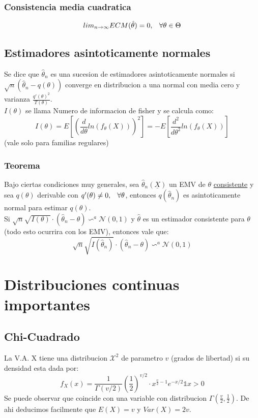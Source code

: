\documentclass[titlepage,a4paper]{article}
\begin{document}
\subsubsection{Consistencia media cuadratica}
\begin{equation*}
    lim_{n \rightarrow \infty}ECM(\hat{\theta}) = 0, \hspace{8px} \forall \theta \in \Theta
\end{equation*}
\subsection{Estimadores asintoticamente normales}
Se dice que $\hat{\theta}_{n}$ es una sucesion de estimadores asintoticamente normales si $\sqrt{n}(\hat{\theta}_{n} - q(\theta))$
converge en distribucion a una normal con media cero y varianza $\frac{q'(\theta)^{2}}{T(\theta)}$.\\
$I(\theta)$ se llama \color{orange} Numero de informacion de fisher \color{black} y se calcula como:
\begin{equation*}
    I(\theta) = E[(\frac{d}{d\theta}ln(f_{\theta}(X)))^{2}] = - E[\frac{d^{2}}{d\theta^{2}}ln(f_{\theta}(X))]
\end{equation*}
(vale solo para familias regulares)
\subsubsection{Teorema}
Bajo ciertas condiciones muy generales, sea $\hat{\theta}_{n}(\underline{X})$ un EMV de $\theta$ \underline{consistente} y sea $q(\theta)$ derivable con $q'(\theta) \neq 0, \hspace{8px} \forall \theta$, entonces
$q(\hat{\theta}_{n})$ es asintoticamente normal para estimar $q(\theta)$.\\
Si $\sqrt{n}\sqrt{I(\theta)} \cdot (\hat{\theta}_{n}- \theta) \backsim^{a} \mathcal{N}(0,1)$ y $\hat{\theta}$ es un estimador consistente para $\theta$ (todo esto ocurrira con los EMV), entonces vale que:\\
\begin{equation*}
    \sqrt{n}\sqrt{I(\hat{\theta}_{n})} \cdot (\hat{\theta}_{n}- \theta) \backsim^{a} \mathcal{N}(0,1)
\end{equation*}
\section{Distribuciones continuas importantes}
\subsection{Chi-Cuadrado}
La V.A. X tiene una distribucion $\mathcal{X}^{2}$ de parametro $v$ (grados de libertad) si su densidad esta dada por:
\begin{equation*}
    f_{X}(x) = \frac{1}{\Gamma(v/2)} (\frac{1}{2})^{v/2} \cdot x^{\frac{v}{2}-1} e^{-x/2} \mathbb{1} {x>0}
\end{equation*}
Se puede observar que coincide con una variable con distribucion $\Gamma(\frac{v}{2},\frac{1}{2})$. De ahi deducimos facilmente que $E(X)=v$ y $Var(X) =2v$.\\
\end{document}
